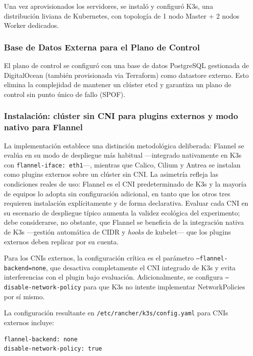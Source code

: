Una vez aprovisionados los servidores, se instaló y configuró K3s, una distribución liviana de Kubernetes, con topología de 1 nodo Master + 2 nodos Worker dedicados.

\subsubsection{Base de Datos Externa para el Plano de Control}

El plano de control se configuró con una base de datos PostgreSQL gestionada de DigitalOcean (también provisionada via Terraform) como datastore externo. Esto elimina la complejidad de mantener un clúster etcd y garantiza un plano de control sin punto único de fallo (SPOF).

\subsubsection{Instalación: clúster sin CNI para plugins externos y modo nativo para Flannel}

La implementación establece una distinción metodológica deliberada: Flannel se evalúa en su modo de despliegue más habitual ---integrado nativamente en K3s con \texttt{flannel-iface: eth1}---, mientras que Calico, Cilium y Antrea se instalan como plugins externos sobre un clúster sin CNI. La asimetría refleja las condiciones reales de uso: Flannel es el CNI predeterminado de K3s y la mayoría de equipos lo adopta sin configuración adicional, en tanto que los otros tres requieren instalación explícitamente y de forma declarativa. Evaluar cada CNI en su escenario de despliegue típico aumenta la validez ecológica del experimento; debe considerarse, no obstante, que Flannel se beneficia de la integración nativa de K3s ---gestión automática de CIDR y \emph{hooks} de kubelet--- que los plugins externos deben replicar por su cuenta.

Para los CNIs externos, la configuración crítica es el parámetro \texttt{--flannel-backend=none}, que desactiva completamente el CNI integrado de K3s y evita interferencias con el plugin bajo evaluación. Adicionalmente, se configura \texttt{--disable-network-policy} para que K3s no intente implementar NetworkPolicies por sí mismo.

La configuración resultante en \texttt{/etc/rancher/k3s/config.yaml} para CNIs externos incluye:
\begin{lstlisting}
flannel-backend: none
disable-network-policy: true
\end{lstlisting}

